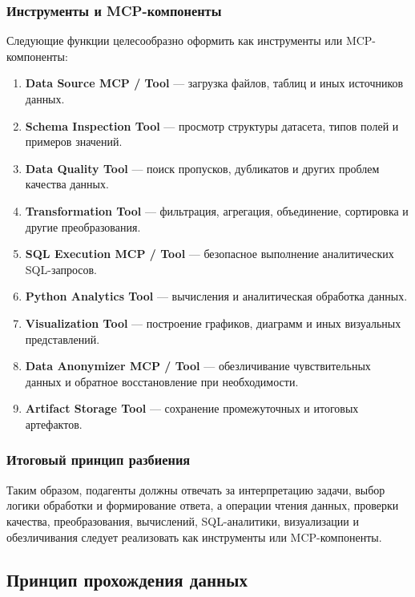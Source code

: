 \documentclass[14pt,a4paper]{extarticle}
\begin{document}
\subsubsection{Инструменты и MCP-компоненты}

Следующие функции целесообразно оформить как инструменты или MCP-компоненты:

\begin{enumerate}
    \item \textbf{Data Source MCP / Tool} --- загрузка файлов, таблиц и иных источников данных.
    \item \textbf{Schema Inspection Tool} --- просмотр структуры датасета, типов полей и примеров значений.
    \item \textbf{Data Quality Tool} --- поиск пропусков, дубликатов и других проблем качества данных.
    \item \textbf{Transformation Tool} --- фильтрация, агрегация, объединение, сортировка и другие преобразования.
    \item \textbf{SQL Execution MCP / Tool} --- безопасное выполнение аналитических SQL-запросов.
    \item \textbf{Python Analytics Tool} --- вычисления и аналитическая обработка данных.
    \item \textbf{Visualization Tool} --- построение графиков, диаграмм и иных визуальных представлений.
    \item \textbf{Data Anonymizer MCP / Tool} --- обезличивание чувствительных данных и обратное восстановление при необходимости.
    \item \textbf{Artifact Storage Tool} --- сохранение промежуточных и итоговых артефактов.
\end{enumerate}

\subsubsection{Итоговый принцип разбиения}

Таким образом, подагенты должны отвечать за интерпретацию задачи, выбор логики обработки и формирование ответа, а операции чтения данных, проверки качества, преобразования, вычислений, SQL-аналитики, визуализации и обезличивания следует реализовать как инструменты или MCP-компоненты.

\subsection{Принцип прохождения данных}
\end{document}
